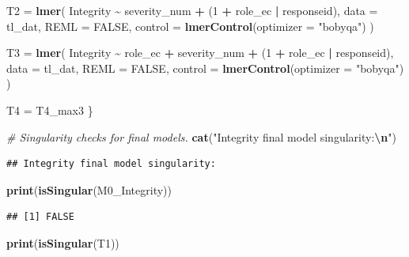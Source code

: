 \documentclass[
]{article}
\newenvironment{Shaded}{\begin{snugshade}}{\end{snugshade}}
\newcommand{\AttributeTok}[1]{\textcolor[rgb]{0.13,0.29,0.53}{#1}}
\newcommand{\CommentTok}[1]{\textcolor[rgb]{0.56,0.35,0.01}{\textit{#1}}}
\newcommand{\ConstantTok}[1]{\textcolor[rgb]{0.56,0.35,0.01}{#1}}
\newcommand{\DecValTok}[1]{\textcolor[rgb]{0.00,0.00,0.81}{#1}}
\newcommand{\FunctionTok}[1]{\textcolor[rgb]{0.13,0.29,0.53}{\textbf{#1}}}
\newcommand{\NormalTok}[1]{#1}
\newcommand{\OtherTok}[1]{\textcolor[rgb]{0.56,0.35,0.01}{#1}}
\newcommand{\SpecialCharTok}[1]{\textcolor[rgb]{0.81,0.36,0.00}{\textbf{#1}}}
\newcommand{\StringTok}[1]{\textcolor[rgb]{0.31,0.60,0.02}{#1}}
\begin{document}
\begin{Shaded}
\begin{Highlighting}[]
\NormalTok{  T2 }\OtherTok{=} \FunctionTok{lmer}\NormalTok{(}
\NormalTok{    Integrity }\SpecialCharTok{\textasciitilde{}}\NormalTok{ severity\_num }\SpecialCharTok{+}
\NormalTok{      (}\DecValTok{1} \SpecialCharTok{+}\NormalTok{ role\_ec }\SpecialCharTok{|}\NormalTok{ responseid),}
    \AttributeTok{data =}\NormalTok{ tl\_dat,}
    \AttributeTok{REML =} \ConstantTok{FALSE}\NormalTok{,}
    \AttributeTok{control =} \FunctionTok{lmerControl}\NormalTok{(}\AttributeTok{optimizer =} \StringTok{"bobyqa"}\NormalTok{)}
\NormalTok{  )}

\NormalTok{  T3 }\OtherTok{=} \FunctionTok{lmer}\NormalTok{(}
\NormalTok{    Integrity }\SpecialCharTok{\textasciitilde{}}\NormalTok{ role\_ec }\SpecialCharTok{+}\NormalTok{ severity\_num }\SpecialCharTok{+}
\NormalTok{      (}\DecValTok{1} \SpecialCharTok{+}\NormalTok{ role\_ec }\SpecialCharTok{|}\NormalTok{ responseid),}
    \AttributeTok{data =}\NormalTok{ tl\_dat,}
    \AttributeTok{REML =} \ConstantTok{FALSE}\NormalTok{,}
    \AttributeTok{control =} \FunctionTok{lmerControl}\NormalTok{(}\AttributeTok{optimizer =} \StringTok{"bobyqa"}\NormalTok{)}
\NormalTok{  )}

\NormalTok{  T4 }\OtherTok{=}\NormalTok{ T4\_max3}
\NormalTok{\}}


\CommentTok{\# Singularity checks for final models.}
\FunctionTok{cat}\NormalTok{(}\StringTok{"Integrity final model singularity:}\SpecialCharTok{\textbackslash{}n}\StringTok{"}\NormalTok{)}
\end{Highlighting}
\end{Shaded}

\begin{verbatim}
## Integrity final model singularity:
\end{verbatim}

\begin{Shaded}
\begin{Highlighting}[]
\FunctionTok{print}\NormalTok{(}\FunctionTok{isSingular}\NormalTok{(M0\_Integrity))}
\end{Highlighting}
\end{Shaded}

\begin{verbatim}
## [1] FALSE
\end{verbatim}

\begin{Shaded}
\begin{Highlighting}[]
\FunctionTok{print}\NormalTok{(}\FunctionTok{isSingular}\NormalTok{(T1))}
\end{Highlighting}
\end{Shaded}
\end{document}
